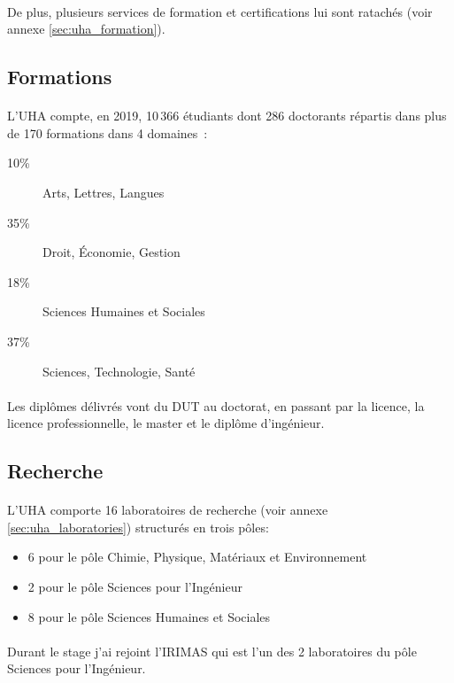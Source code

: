 \documentclass[a4paper,11pt,twoside,french,report]{../common/simplem}
\begin{document}
				\paragraph*{}
					De plus, plusieurs services de formation et certifications lui sont ratachés (voir annexe \ref{sec:uha_formation}).
			\subsection{Formations}
				\paragraph*{}
					L'UHA compte, en 2019, 10\,366 étudiants dont 286 doctorants répartis dans plus de 170 formations dans 4 domaines~\cite{UHA_Chiffre_cles}:
					\begin{description}
						\item[10\%] Arts, Lettres, Langues
						\item[35\%] Droit, Économie, Gestion
						\item[18\%] Sciences Humaines et Sociales
						\item[37\%] Sciences, Technologie, Santé
					\end{description}
				\paragraph*{}
					Les diplômes délivrés vont du \gls{DUT} au doctorat, en passant par la licence, la licence professionnelle, le master et le diplôme d'ingénieur.
			\subsection{Recherche}
				\paragraph*{}
					L'\gls{UHA} comporte 16 laboratoires de recherche (voir annexe \ref{sec:uha_laboratories}) structurés en trois pôles:
					\begin{itemize}
						\item 6 pour le pôle Chimie, Physique, Matériaux et Environnement
						\item 2 pour le pôle Sciences pour l'Ingénieur
						\item 8 pour le pôle Sciences Humaines et Sociales
					\end{itemize}
				\paragraph*{}
					Durant le stage j'ai rejoint l'\gls{IRIMAS} qui est l'un des 2 laboratoires du pôle Sciences pour l'Ingénieur.
\end{document}
